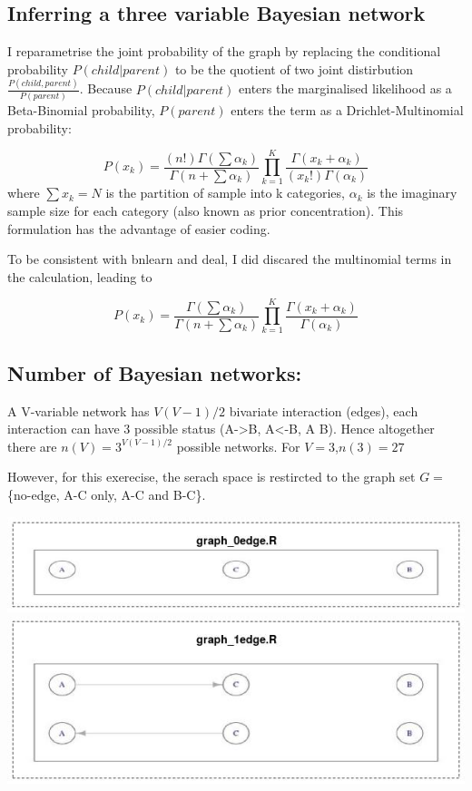 \documentclass[]{article}
\title{}
\author{}
\date{16 March, 2018}
\theoremstyle{definition}
\theoremstyle{definition}
\theoremstyle{definition}
\theoremstyle{remark}
\begin{document}
{
\setcounter{tocdepth}{2}
\tableofcontents
}
\subsection{Inferring a three variable Bayesian
network}\label{inferring-a-three-variable-bayesian-network}

I reparametrise the joint probability of the graph by replacing the
conditional probability \(P(child|parent)\) to be the quotient of two
joint distirbution \(\frac{P(child,parent)}{P(parent)}\). Because
\(P(child|parent)\) enters the marginalised likelihood as a
Beta-Binomial probability, \(P(parent)\) enters the term as a
Drichlet-Multinomial probability:

\[
P(x_k)={\frac {\left(n!\right)\Gamma \left(\sum \alpha _{k}\right)}{\Gamma \left(n+\sum \alpha _{k}\right)}}\prod _{k=1}^{K}{\frac {\Gamma (x_{k}+\alpha _{k})}{\left(x_{k}!\right)\Gamma (\alpha _{k})}}
\] where \(\sum{x_k}=N\) is the partition of sample into k categories,
\(\alpha_k\) is the imaginary sample size for each category (also known
as prior concentration). This formulation has the advantage of easier
coding.

To be consistent with bnlearn and deal, I did discared the multinomial
terms in the calculation, leading to

\[
P(x_k)={\frac {\Gamma \left(\sum \alpha _{k}\right)}{\Gamma \left(n+\sum \alpha _{k}\right)}}\prod _{k=1}^{K}{\frac {\Gamma (x_{k}+\alpha _{k})}{\Gamma (\alpha _{k})}}
\]

\subsection{Number of Bayesian
networks:}\label{number-of-bayesian-networks}

A V-variable network has \(V(V-1)/2\) bivariate interaction (edges),
each interaction can have 3 possible status (A-\textgreater{}B,
A\textless{}-B, A B). Hence altogether there are \(n(V) = 3^{V(V-1)/2}\)
possible networks. For \(V=3\),\(n(3)=27\)

However, for this exerecise, the serach space is restircted to the graph
set \(G=\) \{no-edge, A-C only, A-C and B-C\}.

\includegraphics{graph_0edge.jpg} \includegraphics{graph_1edge.jpg}
\end{document}

